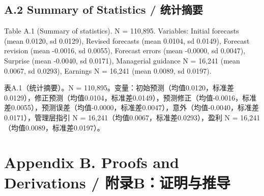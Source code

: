 \documentclass[12pt,a4paper]{article}
\newenvironment{original}
  {\par\medskip\noindent\ignorespaces}
  {\par\medskip}
\newenvironment{translation}
  {\par\noindent{\color{transblue}\ignorespaces}}
  {\par\bigskip}
\begin{document}
\subsection{A.2 Summary of Statistics / 统计摘要}

\begin{original}
Table A.1 (Summary of statistics). N = 110,895. Variables: Initial forecasts (mean 0.0120, sd 0.0129), Revised forecasts (mean 0.0104, sd 0.0149), Forecast revision (mean -0.0016, sd 0.0055), Forecast errors (mean -0.0000, sd 0.0047), Surprise (mean -0.0040, sd 0.0171), Managerial guidance N = 16,241 (mean 0.0067, sd 0.0293), Earnings N = 16,241 (mean 0.0089, sd 0.0197).
\end{original}
\begin{translation}
表A.1（统计摘要）。N = 110,895。变量：初始预测（均值0.0120，标准差0.0129），修正预测（均值0.0104，标准差0.0149），预测修正（均值-0.0016，标准差0.0055），预测误差（均值-0.0000，标准差0.0047），意外（均值-0.0040，标准差0.0171），管理层指引 N = 16,241（均值0.0067，标准差0.0293），盈利 N = 16,241（均值0.0089，标准差0.0197）。
\end{translation}

\newpage

\section{Appendix B. Proofs and Derivations / 附录B：证明与推导}
\end{document}
